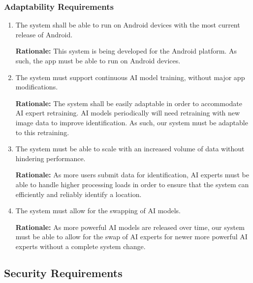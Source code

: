 \documentclass[]{article}
\begin{document}
\subsubsection{Adaptability Requirements}
\label{ssub:adaptability_requirements}
\begin{enumerate}[{MS-A}1. ]
	\item The system shall be able to run on Android devices with the most current release of Android. 

    {\bf Rationale:} This system is being developed for the Android platform. As such, the app must be able to run on Android devices.
    \item The system must support continuous AI model training, without major app modifications.  

    {\bf Rationale:} The system shall be easily adaptable in order to accommodate AI expert retraining. AI models periodically will need retraining with new image data to improve identification. As such, our system must be adaptable to this retraining.
    \item The system must be able to scale with an increased volume of data without hindering performance. 

    {\bf Rationale:} As more users submit data for identification, AI experts must be able to handle higher processing loads in order to ensure that the system can efficiently and reliably identify a location.
    \item The system must allow for the swapping of AI models. 

    {\bf Rationale:} As more powerful AI models are released over time, our system must be able to allow for the swap of AI experts for newer more powerful AI experts without a complete system change. 
\end{enumerate}


\subsection{Security Requirements}
\label{sub:security_requirements}
\end{document}
